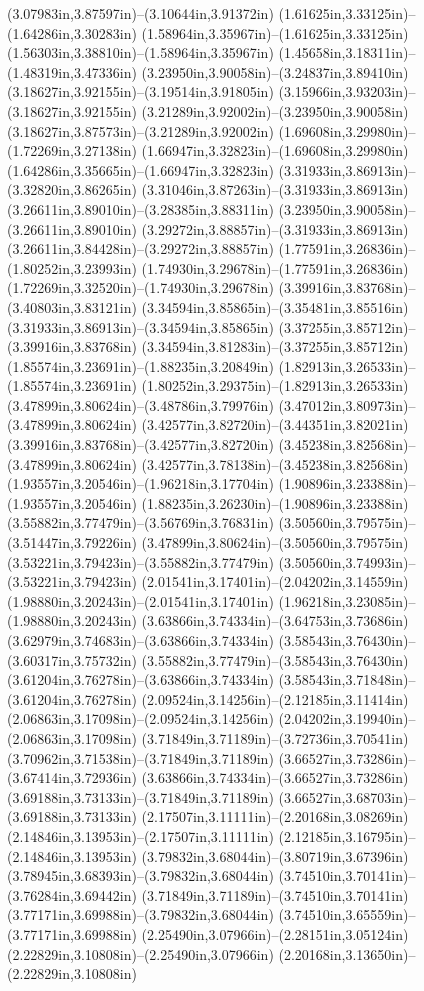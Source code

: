 (3.07983in,3.87597in)--(3.10644in,3.91372in) (1.61625in,3.33125in)--(1.64286in,3.30283in) (1.58964in,3.35967in)--(1.61625in,3.33125in) (1.56303in,3.38810in)--(1.58964in,3.35967in) (1.45658in,3.18311in)--(1.48319in,3.47336in) (3.23950in,3.90058in)--(3.24837in,3.89410in) (3.18627in,3.92155in)--(3.19514in,3.91805in) (3.15966in,3.93203in)--(3.18627in,3.92155in) (3.21289in,3.92002in)--(3.23950in,3.90058in) (3.18627in,3.87573in)--(3.21289in,3.92002in) (1.69608in,3.29980in)--(1.72269in,3.27138in) (1.66947in,3.32823in)--(1.69608in,3.29980in) (1.64286in,3.35665in)--(1.66947in,3.32823in) (3.31933in,3.86913in)--(3.32820in,3.86265in) (3.31046in,3.87263in)--(3.31933in,3.86913in) (3.26611in,3.89010in)--(3.28385in,3.88311in) (3.23950in,3.90058in)--(3.26611in,3.89010in) (3.29272in,3.88857in)--(3.31933in,3.86913in) (3.26611in,3.84428in)--(3.29272in,3.88857in) (1.77591in,3.26836in)--(1.80252in,3.23993in) (1.74930in,3.29678in)--(1.77591in,3.26836in) (1.72269in,3.32520in)--(1.74930in,3.29678in) (3.39916in,3.83768in)--(3.40803in,3.83121in) (3.34594in,3.85865in)--(3.35481in,3.85516in) (3.31933in,3.86913in)--(3.34594in,3.85865in) (3.37255in,3.85712in)--(3.39916in,3.83768in) (3.34594in,3.81283in)--(3.37255in,3.85712in) (1.85574in,3.23691in)--(1.88235in,3.20849in) (1.82913in,3.26533in)--(1.85574in,3.23691in) (1.80252in,3.29375in)--(1.82913in,3.26533in) (3.47899in,3.80624in)--(3.48786in,3.79976in) (3.47012in,3.80973in)--(3.47899in,3.80624in) (3.42577in,3.82720in)--(3.44351in,3.82021in) (3.39916in,3.83768in)--(3.42577in,3.82720in) (3.45238in,3.82568in)--(3.47899in,3.80624in) (3.42577in,3.78138in)--(3.45238in,3.82568in) (1.93557in,3.20546in)--(1.96218in,3.17704in) (1.90896in,3.23388in)--(1.93557in,3.20546in) (1.88235in,3.26230in)--(1.90896in,3.23388in) (3.55882in,3.77479in)--(3.56769in,3.76831in) (3.50560in,3.79575in)--(3.51447in,3.79226in) (3.47899in,3.80624in)--(3.50560in,3.79575in) (3.53221in,3.79423in)--(3.55882in,3.77479in) (3.50560in,3.74993in)--(3.53221in,3.79423in) (2.01541in,3.17401in)--(2.04202in,3.14559in) (1.98880in,3.20243in)--(2.01541in,3.17401in) (1.96218in,3.23085in)--(1.98880in,3.20243in) (3.63866in,3.74334in)--(3.64753in,3.73686in) (3.62979in,3.74683in)--(3.63866in,3.74334in) (3.58543in,3.76430in)--(3.60317in,3.75732in) (3.55882in,3.77479in)--(3.58543in,3.76430in) (3.61204in,3.76278in)--(3.63866in,3.74334in) (3.58543in,3.71848in)--(3.61204in,3.76278in) (2.09524in,3.14256in)--(2.12185in,3.11414in) (2.06863in,3.17098in)--(2.09524in,3.14256in) (2.04202in,3.19940in)--(2.06863in,3.17098in) (3.71849in,3.71189in)--(3.72736in,3.70541in) (3.70962in,3.71538in)--(3.71849in,3.71189in) (3.66527in,3.73286in)--(3.67414in,3.72936in) (3.63866in,3.74334in)--(3.66527in,3.73286in) (3.69188in,3.73133in)--(3.71849in,3.71189in) (3.66527in,3.68703in)--(3.69188in,3.73133in) (2.17507in,3.11111in)--(2.20168in,3.08269in) (2.14846in,3.13953in)--(2.17507in,3.11111in) (2.12185in,3.16795in)--(2.14846in,3.13953in) (3.79832in,3.68044in)--(3.80719in,3.67396in) (3.78945in,3.68393in)--(3.79832in,3.68044in) (3.74510in,3.70141in)--(3.76284in,3.69442in) (3.71849in,3.71189in)--(3.74510in,3.70141in) (3.77171in,3.69988in)--(3.79832in,3.68044in) (3.74510in,3.65559in)--(3.77171in,3.69988in) (2.25490in,3.07966in)--(2.28151in,3.05124in) (2.22829in,3.10808in)--(2.25490in,3.07966in) (2.20168in,3.13650in)--(2.22829in,3.10808in) 